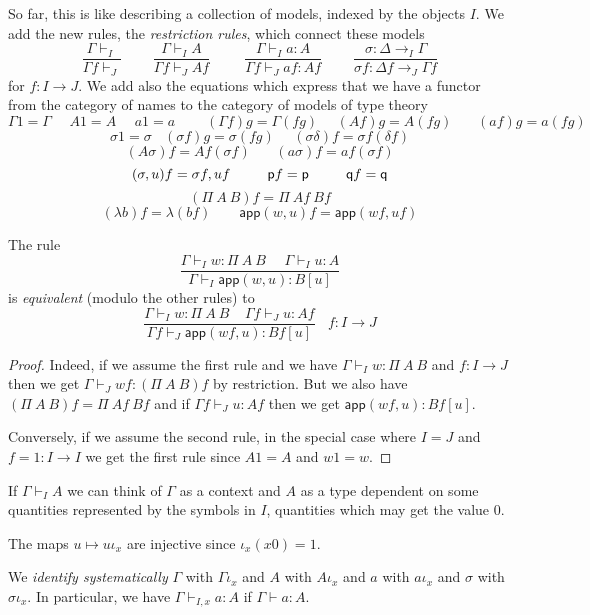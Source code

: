 \documentclass[10pt,a4paper]{article}
\newcommand{\app}{\mathsf{app}}
\newcommand{\pp}{{\sf p}}
\newcommand{\qq}{{\sf q}}
\begin{document}
\medskip

 So far, this is like describing a collection of models, indexed by the objects $I$.
We add the new rules, the {\em restriction rules}, which connect these models
$$
\frac{\Gamma\vdash_I}{\Gamma f\vdash _J}~~~~~~~~~~
\frac{\Gamma\vdash_I A}{\Gamma f\vdash _J A f}~~~~~~~~~~~
\frac{\Gamma\vdash_I a:A}{\Gamma f\vdash _J af:Af}~~~~~~~~~~
\frac{\sigma:\Delta\rightarrow_I \Gamma}{\sigma f:\Delta f\rightarrow _J\Gamma f}
$$
for $f:I\rightarrow J$. We add also the equations which express that we have
a functor from the category of names to the category of models of type theory
$$
\Gamma 1 = \Gamma~~~~~~A 1 = A~~~~~~a1 = a~~~~~~~~~~(\Gamma f)g = \Gamma (fg)~~~~~~
(A f)g = A (fg)~~~~~~~~(af)g = a(fg)
$$
$$
\sigma 1 = \sigma~~~~(\sigma f) g = \sigma (fg)~~~~~~(\sigma\delta)f = \sigma f(\delta f)
$$
$$
(A\sigma) f = Af (\sigma f)~~~~~~~~(a\sigma)f = af (\sigma f)
$$
$$
(\sigma,u) f = \sigma f,uf~~~~~~~~\pp f = \pp ~~~~~~~~\qq f = \qq
$$
$$
(\Pi~A~B)f = \Pi~Af~Bf
$$
$$
(\lambda b) f = \lambda (bf)~~~~~~~~~\app(w,u)f = \app(wf,uf)
$$

\begin{theorem}
The rule
$$
\frac{\Gamma\vdash_I w:\Pi~A~B~~~~~~\Gamma\vdash_I u:A}{\Gamma\vdash_I \app(w,u):B[u]}
$$
is {\em equivalent} (modulo the other rules) to
$$
\frac{\Gamma\vdash_I w:\Pi~A~B~~~~~\Gamma f\vdash_J u:Af}{\Gamma f\vdash_J \app(wf,u):Bf[u]}{~~~~f:I\rightarrow J}
$$
\end{theorem}

\begin{proof}
Indeed, if we assume the first rule and we have $\Gamma\vdash_I w:\Pi~A~B$ and $f:I\rightarrow J$ then
we get $\Gamma\vdash_J wf:(\Pi~A~B)f$ by restriction. But we also have $(\Pi~A~B)f = \Pi~Af~Bf$ and if 
$\Gamma f \vdash_J u:Af$ then we get $\app(wf,u):Bf[u]$.

 Conversely, if we assume the second rule, in the special case where $I=J$ and $f = 1:I\rightarrow I$
we get the first rule since $A1 = A$ and $w1 = w$.
\end{proof}
\medskip

 If $\Gamma\vdash_I A$ we can think of $\Gamma$ as a context and $A$ as a type
dependent on some quantities represented by the symbols in $I$, quantities which 
may get the value $0$.

\medskip

 The maps $u\longmapsto u\iota_x$ are injective since $\iota_x(x0) = 1$.

 We {\em identify systematically} $\Gamma$ with $\Gamma\iota_x$ and $A$ with $A\iota_x$
and $a$ with $a\iota_x$ and $\sigma$ with $\sigma\iota_x$. In particular, we have
$\Gamma\vdash_{I,x} a:A$ if $\Gamma\vdash a:A$.
\end{document}
